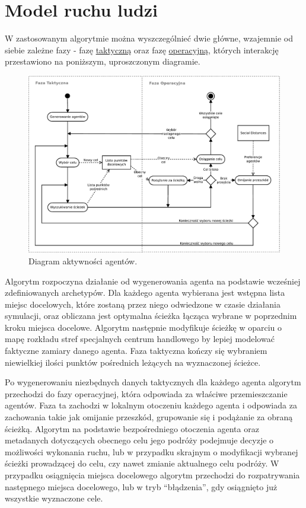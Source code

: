 \documentclass[a4paper, 12pt]{article}
\begin{document}
\newpage
    \section{Model ruchu ludzi}
    \label{sec:move-model}

\noindent
W zastosowanym algorytmie można wyszczególnieć dwie główne, wzajemnie od siebie zależne fazy - fazę \hyperref[sec:tactical]{taktyczną} oraz fazę \hyperref[sec:operational]{operacyjną}, których interakcję przestawiono na poniższym, uproszczonym diagramie.

    \begin{figure}[H]
        \centering
        \includegraphics[scale=0.55]{./img/ActorActivity.pdf}
        \caption{Diagram aktywności agentów.}
        \label{fig:actor-activity}
    \end{figure}

Algorytm rozpoczyna działanie od wygenerowania agenta na podstawie wcześniej zdefiniowanych archetypów.
Dla każdego agenta wybierana jest wstępna lista miejsc docelowych, które zostaną przez niego odwiedzone w czasie działania symulacji, oraz obliczana jest optymalna ścieżka łącząca wybrane w poprzednim kroku miejsca docelowe. Algorytm następnie modyfikuje ścieżkę w oparciu o mapę rozkładu stref specjalnych centrum handlowego by lepiej modelować faktyczne zamiary danego agenta. Faza taktyczna kończy się wybraniem niewielkiej ilości punktów pośrednich leżących na wyznaczonej ścieżce.

Po wygenerowaniu niezbędnych danych taktycznych dla każdego agenta algorytm przechodzi do fazy operacyjnej, która odpowiada za właściwe przemieszczanie agentów. Faza ta zachodzi w lokalnym otoczeniu każdego agenta i odpowiada za zachowania takie jak omijanie przeszkód, grupowanie się i podążanie za obraną ścieżką.
Algorytm na podstawie bezpośredniego otoczenia agenta oraz metadanych dotyczących obecnego celu jego podróży podejmuje decyzje o możliwości wykonania ruchu, lub w przypadku skrajnym o modyfikacji wybranej ścieżki prowadzącej do celu, czy nawet zmianie aktualnego celu podróży.
W przypadku osiągnięcia miejsca docelowego algorytm przechodzi do rozpatrywania następnego miejsca docelowego, lub w tryb ``błądzenia'', gdy osiągnięto już wszystkie wyznaczone cele.
\end{document}

